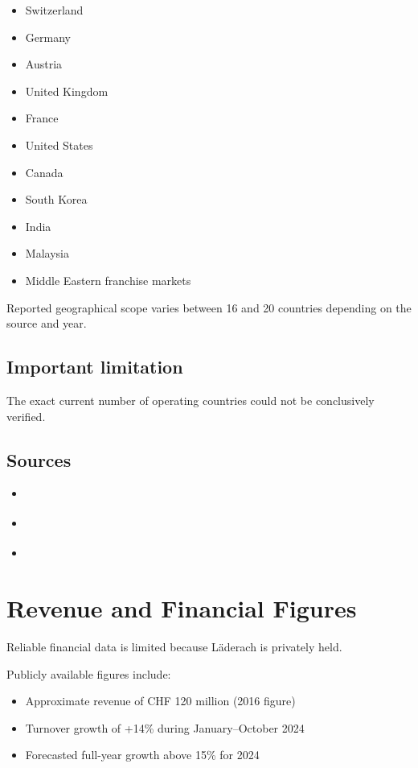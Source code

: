 \begin{itemize}
    \item Switzerland
    \item Germany
    \item Austria
    \item United Kingdom
    \item France
    \item United States
    \item Canada
    \item South Korea
    \item India
    \item Malaysia
    \item Middle Eastern franchise markets
\end{itemize}

Reported geographical scope varies between 16 and 20 countries depending on the source and year.

\subsection*{Important limitation}

The exact current number of operating countries could not be conclusively verified.

\subsection*{Sources}

\begin{itemize}
    \item \cite{wikipediaLaederach}
    \item \cite{laderachLeadershipNextGeneration}
    \item \cite{deloitteBestManagedCompanies}
\end{itemize}

\section{Revenue and Financial Figures}

Reliable financial data is limited because Läderach is privately held.

Publicly available figures include:

\begin{itemize}
    \item Approximate revenue of CHF 120 million (2016 figure)
    \item Turnover growth of +14\% during January--October 2024
    \item Forecasted full-year growth above 15\% for 2024
\end{itemize}

